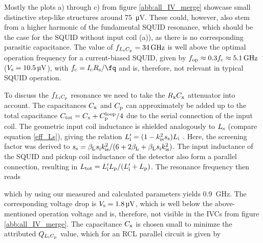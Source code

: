 Mostly the plots a) through c) from figure \ref{abb:all_IV_merge} showcase small distinctive step-like structures around \qty{75}{\uV}. These could, however, also stem from a higher harmonic of the fundamental SQUID resonance, which should be the case for the SQUID without input coil (a)), as there is no corresponding parasitic capacitance. The value of $f_{L_{\rm s}C_{\rm p}}=\qty{34}{\GHz}$ is well above the optimal operation frequency for a current-biased SQUID, given by $f_{\rm op}\approx 0.3f_{\rm c}\approx\qty{5.1}{\GHz}$ ($V_{\rm s}=\qty{10.5}{\uV}$), with $f_{\rm c}=I_{\rm c}R_{\rm s}/\unit{\fq}$ \cite{Cantor1996} and is, therefore, not relevant in typical SQUID operation.

To discuss the $f_{L_{\rm i}C_{\rm p}}$ resonance we need to take the $R_{\rm x}C_{\rm x}$ attenuator into account. The capacitances $C_{\rm x}$ and $C_{\rm p}$ can approximately be added up to the total capacitance $C_{\rm tot}=C_{\rm x}+C_{\rm p}^{\rm loop}/4$ due to the serial connection of the input coil. The geometric input coil inductance is shielded analogously to $L_{\rm s}$ (compare equation \ref{eff_Ls}), giving the relation $L_{\rm i}'=(1-k_{\rm is}^2s_{\rm s})L_{\rm i}$ \cite{Cantor1996}. Here, the screening factor was derived to $s_{\rm s}=\beta_{\rm L}s_{\rm i}k_{\rm is}^2/(6+2\beta_{\rm L}+\beta_{\rm L}s_{\rm i}k_{\rm is}^2)$. The input inductance of the SQUID and pickup coil inductance of the detector also form a parallel connection, resulting in $L_{\rm tot}=L_{\rm i}'L_{\rm p}/(L_{\rm i}'+L_{\rm p})$. The resonance frequency then reads 


which by using our measured and calculated parameters yields \qty{0.9}{\GHz}. The corresponding voltage drop is $V_{\rm s}=\qty{1.8}{\uV}$, which is well below the above-mentioned operation voltage and is, therefore, not visible in the IVCs from figure \ref{abb:all_IV_merge}. The capacitance $C_{\rm x}$ is chosen small to minimze the attributed $Q_{L_{\rm i}C_{\rm p}}$ value, which for an RCL parallel circuit is given by 


